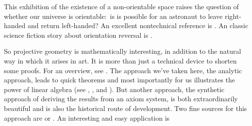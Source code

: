 This exhibition of the existence of a 
non-orientable space raises the question of whether
our universe is orientable:~is is possible for
an astronaut to leave right-handed and return left-handed?
An excellent nontechnical reference is \cite{Gardner}.
An classic science fiction story about 
orientation reversal is \cite{Clarke}.

So projective geometry 
is mathematically interesting,
in addition to the natural way in which it arises in art. 
It is more than just a technical device to shorten some proofs.
For an overview, see \cite{CourantRobbins}. 
The approach we've taken here, the analytic approach,
leads to quick theorems and \Dash  most importantly for us \Dash  illustrates 
the power of linear algebra (see \cite{Hanes}, \cite{Ryan}, and
\cite{Eggar}).
But another approach, the 
synthetic approach of deriving the results
from an axiom system, is both extraordinarily
beautiful and is also the historical route of development.
Two fine sources for this approach are \cite{Coxeter} or \cite{Seidenberg}.
An interesting and easy application is \cite{Davies}

